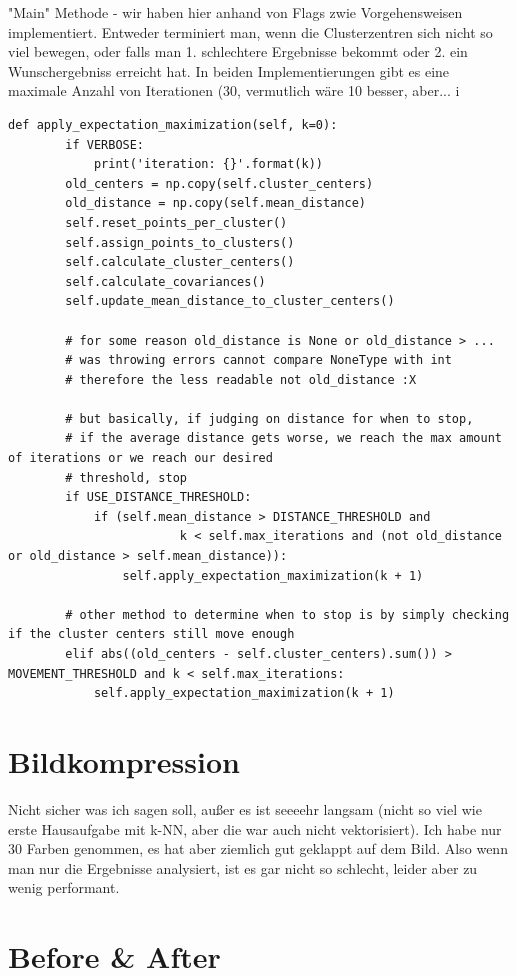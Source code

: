 "Main" Methode - wir haben hier anhand von Flags zwie Vorgehensweisen implementiert. Entweder terminiert man,
wenn die Clusterzentren sich nicht so viel bewegen, oder falls man 1. schlechtere Ergebnisse bekommt oder 2.
ein Wunschergebniss erreicht hat. In beiden Implementierungen gibt es eine maximale Anzahl von Iterationen (30, vermutlich
wäre 10 besser, aber... ^^)
\begin{lstlisting}[style=py]
    def apply_expectation_maximization(self, k=0):
        if VERBOSE:
            print('iteration: {}'.format(k))
        old_centers = np.copy(self.cluster_centers)
        old_distance = np.copy(self.mean_distance)
        self.reset_points_per_cluster()
        self.assign_points_to_clusters()
        self.calculate_cluster_centers()
        self.calculate_covariances()
        self.update_mean_distance_to_cluster_centers()

        # for some reason old_distance is None or old_distance > ...
        # was throwing errors cannot compare NoneType with int
        # therefore the less readable not old_distance :X

        # but basically, if judging on distance for when to stop,
        # if the average distance gets worse, we reach the max amount of iterations or we reach our desired
        # threshold, stop
        if USE_DISTANCE_THRESHOLD:
            if (self.mean_distance > DISTANCE_THRESHOLD and
                        k < self.max_iterations and (not old_distance or old_distance > self.mean_distance)):
                self.apply_expectation_maximization(k + 1)

        # other method to determine when to stop is by simply checking if the cluster centers still move enough
        elif abs((old_centers - self.cluster_centers).sum()) > MOVEMENT_THRESHOLD and k < self.max_iterations:
            self.apply_expectation_maximization(k + 1)
\end{lstlisting}

\section*{Bildkompression}
Nicht sicher was ich sagen soll, außer es ist seeeehr langsam (nicht so viel wie erste Hausaufgabe mit k-NN, aber die
war auch nicht vektorisiert). Ich habe nur 30 Farben genommen, es hat aber ziemlich gut geklappt auf dem Bild. Also wenn
man nur die Ergebnisse analysiert, ist es gar nicht so schlecht, leider aber zu wenig performant.

\section*{Before \& After}

